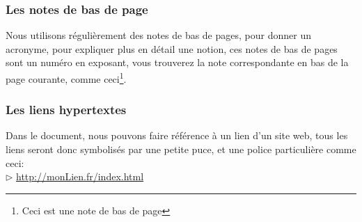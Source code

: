 \subsubsection*{Les notes de bas de page}
Nous utilisons régulièrement des notes de bas de pages, pour donner un acronyme, pour expliquer plus en détail une notion, ces notes de bas de pages sont un numéro
en exposant, vous trouverez la note correspondante en bas de la page courante, comme ceci\footnote{Ceci est une note de bas de page}.
\subsubsection*{Les liens hypertextes}
Dans le document, nous pouvons faire référence à un lien d'un site web, tous les liens seront donc symbolisés par une petite puce, et une police particulière comme ceci:\\
	$\rhd$ \url{http://monLien.fr/index.html}\\

